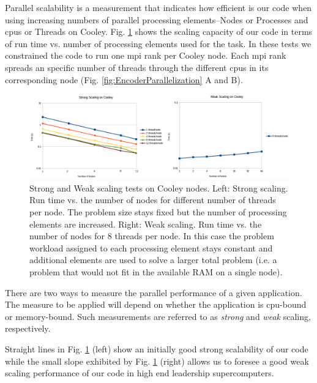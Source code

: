 \documentclass[11pt,a4paper]{article}
\begin{document}
Parallel scalability is a measurement that indicates how efficient is our code when using increasing numbers of parallel processing elements--Nodes or Processes and \glspl{cpu} or Threads on Cooley. Fig. \ref{fig:Strong_Weak} shows the scaling capacity of our code in terms of run time vs. number of processing elements used for the task. In these tests we constrained the code to run one \gls{mpi} rank per Cooley node. Each \gls{mpi} rank spreads an specific number of threads through the different \glspl{cpu} in its corresponding node (Fig. \ref{fig:EncoderParallelization} A and B).

\begin{figure}[h!]
    \centering
    \includegraphics[width=1.0\textwidth]{Strong_Weak.png}
    \caption{Strong and Weak scaling tests on Cooley nodes. Left: Strong scaling. Run time vs. the number of nodes for different number of threads per node. The problem size stays fixed but the number of processing elements are increased. Right: Weak scaling. Run time vs. the number of nodes for 8 threads per node. In this case the problem workload assigned to each processing element stays constant and additional elements are used to solve a larger total problem (i.e. a problem that would not fit in the available RAM on a single node).}
    \label{fig:Strong_Weak}
\end{figure}

There are two ways to measure the parallel performance of a given application. The measure to be applied will depend on whether the application is \gls{cpu}-bound or memory-bound. Such measurements are referred to as \emph{strong} and \emph{weak} scaling, respectively.

Straight lines in Fig. \ref{fig:Strong_Weak} (left) show an initially good strong scalability of our code while the small slope exhibited by Fig. \ref{fig:Strong_Weak} (right) allows us to foresee a good weak scaling performance of our code in high end leadership supercomputers.
\end{document}
